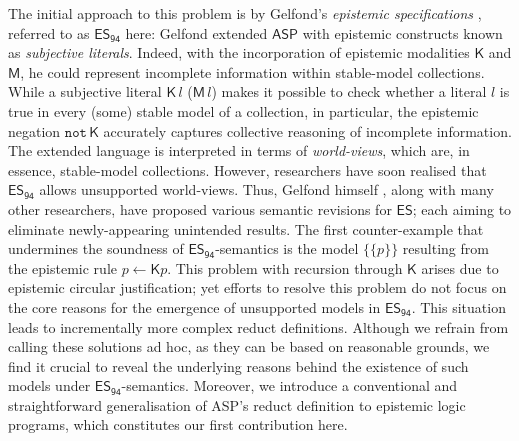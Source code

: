 \documentclass[submission,copyright,creativecommons]{eptcs}
\newcommand{\set}[1]  { \{ #1 \} }
\newcommand{\logic}[1]  { \ensuremath{\mathsf{#1}} }
\newcommand{\ASP}  { \logic{ASP} }
\newcommand{\ES}  { \logic{ES} }
\newcommand{\lpnot}  { \mathtt{not} \, }
\newcommand{\K}  { \mathsf{K} }
\newcommand{\M}  { \mathsf{M} }
\newcommand{\ESdoksandort}  { \logic{ES_{\scriptscriptstyle{94}} } }
\begin{document}
The initial approach to this problem is by Gelfond's 
\emph{epistemic specifications}
\cite{Gelfond91strong,gelfond94}, referred to as $\ESdoksandort$ here: 
Gelfond extended $\ASP$ with epistemic constructs 
known as \emph{subjective literals}. Indeed, 
with the incorporation of epistemic modalities $\K$ and $\M$,  
he could represent incomplete information within stable-model collections. 
While a subjective literal $\K\,l$ ($\M\,l$) makes it possible to check 
whether a literal $l$ is true 
in every (some) stable model of a collection, in particular, 
the epistemic negation $\lpnot \K$ accurately captures collective reasoning of incomplete information.
The extended language is interpreted in terms of
\emph{world-views}, which are, in essence, stable-model collections.
However, researchers have soon realised that $\ESdoksandort$ allows unsupported world-views.
Thus, Gelfond himself \cite{gelfond2011new}, along with many other researchers,
have proposed various semantic revisions for $\ES$; each aiming to eliminate
newly-appearing unintended results.
The first counter-example that undermines the soundness
of $\ESdoksandort$-semantics is the model $\set{\set p}$ resulting from 
the epistemic rule $p \leftarrow \K p$. This problem with recursion through $\K$ 
arises due to epistemic circular justification; 
yet efforts to resolve this problem do not focus on the core 
reasons for the emergence of unsupported models in $\ESdoksandort$.
This situation leads to incrementally more complex reduct definitions. Although 
we refrain from calling these solutions ad hoc, as they can be based on reasonable grounds,
we find it crucial to reveal the underlying reasons behind
the existence of such models under $\ESdoksandort$-semantics. Moreover, we introduce a conventional and straightforward generalisation of ASP’s 
reduct definition to epistemic logic programs,
which constitutes our first contribution here.
\end{document}

